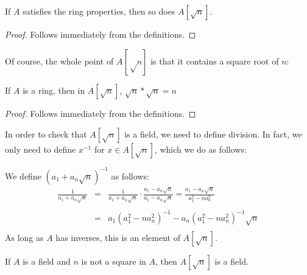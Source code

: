 
\begin{proposition}
  \label{thm:adjoinRing}
  \leanok
  If $A$ satisfies the ring properties, then so does $A[\sqrt{n}]$.
\end{proposition}

\begin{proof}
  \leanok
  Follows immediately from the definitions.
\end{proof}


Of course, the whole point of $A[√n]$ is that it contains a square root of $n$:
\begin{theorem}
  \label{thm:adjoinHasSqrtN}
  If $A$ is a ring, then in $A[\sqrt{n}]$, $\sqrt{n} * \sqrt{n} = n$
\end{theorem}

\begin{proof}
  Follows immediately from the definitions.
\end{proof}


In order to check that $A[\sqrt{n}]$ is a field, we need to define division. In
fact, we only need to define $x^{-1}$ for $x ∈ A[\sqrt{n}]$, which we do as
follows:

\begin{definition}
  \label{def:adjoinInv}
  \leanok
  We define $(a_1 + a_n\sqrt{n})^{-1}$ as follows:
  \begin{eqnarray*}
    \frac{1}{a_1 + a_n\sqrt{n}}
      & = & \frac{1}{a_1 + a_n\sqrt{n}} \cdot \frac{a_1 - a_n\sqrt{n}}{a_1 - a_n\sqrt{n}}
        =   \frac{a_1 - a_n\sqrt{n}}{a_1^2 - na_n^2} \\ \\
      & = & a_1(a_1^2 - na_n^2)^{-1} - a_n(a_1^2 - na_n^2)^{-1}\sqrt{n} \\
  \end{eqnarray*}
  As long as $A$ has inverses, this is an element of $A[\sqrt{n}]$.
\end{definition}

\begin{lemma}
  \label{thm:adjoinField}
  \leanok
  If $A$ is a field and $n$ is not a square in $A$, then $A[\sqrt{n}]$ is a
  field.
\end{lemma}

